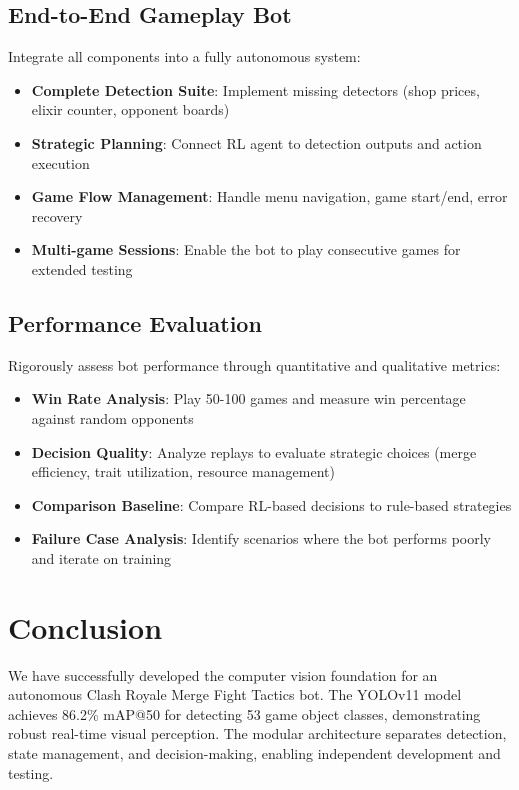\documentclass[12pt]{article}
\begin{document}
\subsection{End-to-End Gameplay Bot}

Integrate all components into a fully autonomous system:

\begin{itemize}
    \item \textbf{Complete Detection Suite}: Implement missing detectors (shop prices, elixir counter, opponent boards)
    \item \textbf{Strategic Planning}: Connect RL agent to detection outputs and action execution
    \item \textbf{Game Flow Management}: Handle menu navigation, game start/end, error recovery
    \item \textbf{Multi-game Sessions}: Enable the bot to play consecutive games for extended testing
\end{itemize}

\subsection{Performance Evaluation}

Rigorously assess bot performance through quantitative and qualitative metrics:

\begin{itemize}
    \item \textbf{Win Rate Analysis}: Play 50-100 games and measure win percentage against random opponents
    \item \textbf{Decision Quality}: Analyze replays to evaluate strategic choices (merge efficiency, trait utilization, resource management)
    \item \textbf{Comparison Baseline}: Compare RL-based decisions to rule-based strategies
    \item \textbf{Failure Case Analysis}: Identify scenarios where the bot performs poorly and iterate on training
\end{itemize}

\section{Conclusion}

We have successfully developed the computer vision foundation for an autonomous Clash Royale Merge Fight Tactics bot. The YOLOv11 model achieves 86.2\% mAP@50 for detecting 53 game object classes, demonstrating robust real-time visual perception. The modular architecture separates detection, state management, and decision-making, enabling independent development and testing.
\end{document}
